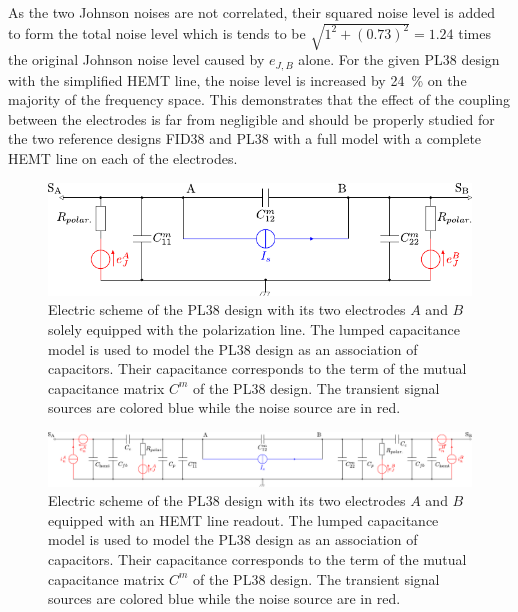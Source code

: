 As the two Johnson noises are not correlated, their squared noise level is added to form the total noise level which is tends to be $\sqrt{1^2 + (0.73)^2} = 1.24$ times the original Johnson noise level caused by $e_{J,B}$ alone. For the given PL38 design with the simplified HEMT line, the noise level is increased by \SI{24}{\percent} on the majority of the frequency space. This demonstrates that the effect of the coupling between the electrodes is far from negligible and should be properly studied for the two reference designs FID38 and PL38 with a full model with a complete HEMT line on each of the electrodes.

\begin{landscape}

\begin{figure}
\centering
\includegraphics[scale=1]{Figures/Electrodes/pl38_analytical_circuit.pdf}
\caption{Electric scheme of the PL38 design with its two electrodes $A$ and $B$ solely equipped with the polarization line. The lumped capacitance model is used to model the PL38 design as an association of capacitors. Their capacitance corresponds to the term of the mutual capacitance matrix $C^m$ of the PL38 design. The transient signal sources are colored blue while the noise source are in red.}
\label{fig:pl38-analytical-circuit}
\end{figure}

\begin{figure}
\centering
\includegraphics[scale=1]{Figures/Electrodes/pl38_full_circuit.pdf}
\caption{Electric scheme of the PL38 design with its two electrodes $A$ and $B$ equipped with an HEMT line readout. The lumped capacitance model is used to model the PL38 design as an association of capacitors. Their capacitance corresponds to the term of the mutual capacitance matrix $C^m$ of the PL38 design. The transient signal sources are colored blue while the noise source are in red.}
\label{fig:pl38-full-circuit}
\end{figure}

\end{landscape}

